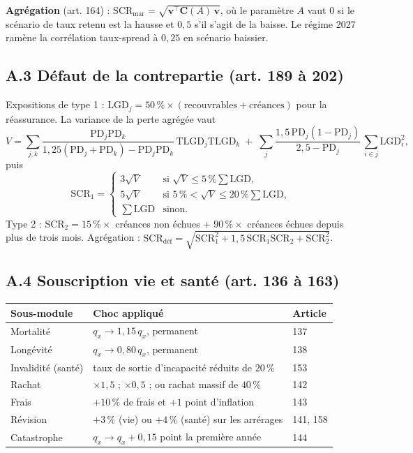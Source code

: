 \textbf{Agrégation} (art. 164) :
$\mathrm{SCR}_{\text{mar}} = \sqrt{\mathbf{v}^{\top} \mathbf{C}(A)\, \mathbf{v}}$, où le
paramètre $A$ vaut $0$ si le scénario de taux retenu est la hausse et $0{,}5$ s'il s'agit de la
baisse. Le régime 2027 ramène la corrélation taux-spread à $0{,}25$ en scénario baissier.

\subsection*{A.3 Défaut de la contrepartie (art. 189 à 202)}

Expositions de type 1 : $\mathrm{LGD}_j = 50\,\% \times (\text{recouvrables} + \text{créances})$
pour la réassurance. La variance de la perte agrégée vaut
\[
V = \sum_{j,k} \frac{\mathrm{PD}_j \mathrm{PD}_k}
{1{,}25(\mathrm{PD}_j+\mathrm{PD}_k) - \mathrm{PD}_j\mathrm{PD}_k}\,
\mathrm{TLGD}_j \mathrm{TLGD}_k
\;+\; \sum_j \frac{1{,}5\,\mathrm{PD}_j(1-\mathrm{PD}_j)}{2{,}5-\mathrm{PD}_j}\,
\sum_{i \in j}\mathrm{LGD}_i^2 ,
\]
puis
\[
\mathrm{SCR}_1 =
\begin{cases}
3\sqrt{V} & \text{si } \sqrt{V} \le 5\,\% \sum \mathrm{LGD},\\
5\sqrt{V} & \text{si } 5\,\% < \sqrt{V} \le 20\,\% \sum \mathrm{LGD},\\
\sum \mathrm{LGD} & \text{sinon.}
\end{cases}
\]
Type 2 : $\mathrm{SCR}_2 = 15\,\%\times$ créances non échues $+\; 90\,\%\times$ créances échues
depuis plus de trois mois. Agrégation :
$\mathrm{SCR}_{\text{déf}} = \sqrt{\mathrm{SCR}_1^2 + 1{,}5\,\mathrm{SCR}_1\mathrm{SCR}_2
+ \mathrm{SCR}_2^2}$.

\subsection*{A.4 Souscription vie et santé (art. 136 à 163)}

\begin{table}[H]\centering\footnotesize
\begin{tabularx}{\linewidth}{lXl}
\toprule
\textbf{Sous-module} & \textbf{Choc appliqué} & \textbf{Article}\\
\midrule
Mortalité & $q_x \rightarrow 1{,}15\,q_x$, permanent & 137\\
Longévité & $q_x \rightarrow 0{,}80\,q_x$, permanent & 138\\
Invalidité (santé) & taux de sortie d'incapacité réduits de $20\,\%$ & 153\\
Rachat & $\times 1{,}5$ ; $\times 0{,}5$ ; ou rachat massif de $40\,\%$ & 142\\
Frais & $+10\,\%$ de frais et $+1$ point d'inflation & 143\\
Révision & $+3\,\%$ (vie) ou $+4\,\%$ (santé) sur les arrérages & 141, 158\\
Catastrophe & $q_x \rightarrow q_x + 0{,}15$ point la première année & 144\\
\bottomrule
\end{tabularx}
\end{table}

